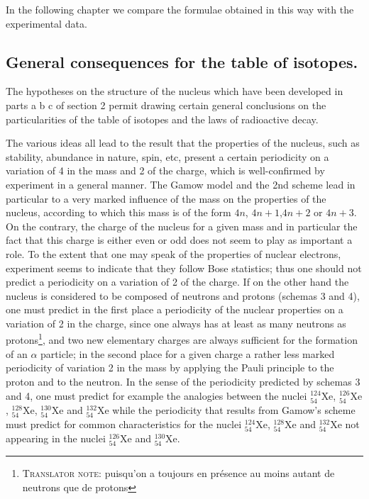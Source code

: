 \documentclass[a4paper,11pt]{article}
\newcommand{\?}[2]{#1\footnote{\textsc{Translator note}: #2}}
\newcommand{\El}[1]{\text{#1}}
\newcommand{\mnEl}[3]{{}^{#1}_{#2}{\El{#3}}}
\begin{document}
{{In the following chapter we compare the formulae obtained in this way with the experimental data.

\subsection{General consequences for the table of isotopes.}

The hypotheses on the structure of the nucleus which have been developed in parts a b c of section 2 permit drawing certain general conclusions on the particularities of the table of isotopes and the laws of radioactive decay.

The various ideas all lead to the result that the properties of the nucleus, such as stability, abundance in nature, spin, etc, present a certain periodicity on a variation of 4 in the mass and 2 of the charge, which is well-confirmed by experiment in a general manner. The Gamow model and the 2nd scheme lead in particular to a very marked influence of the mass on the properties of the nucleus, according to which this mass is of the form $4n$, $4n+1$,$4n+2$ or $4n+3$. On the contrary, the charge of the nucleus for a given mass and in particular the fact that this charge is either even or odd does not seem to play as important a role. To the extent that one may speak of the properties of nuclear electrons, experiment seems to indicate that they follow Bose statistics; thus one should not predict a periodicity on a variation of 2 of the charge. If on the other hand the nucleus is considered to be composed of neutrons and protons (schemas 3 and 4), one must predict in the first place a periodicity of the nuclear properties on a variation of 2 in the charge, \?{since one always has at least as many neutrons as protons}{puisqu’on a toujours en présence au moins autant de neutrons que de protons}, and two new elementary charges are always sufficient for the formation of an $\alpha$ particle; in the second place for a given charge a rather less marked periodicity of variation 2 in the mass by applying the Pauli principle to the proton and to the neutron. In the sense of the periodicity predicted by schemas 3 and 4, one must predict for example the analogies between the nuclei $\mnEl{124}{54}{Xe}$, $\mnEl{126}{54}{Xe}$, $\mnEl{128}{54}{Xe}$, $\mnEl{130}{54}{Xe}$ and $\mnEl{132}{54}{Xe}$ while the periodicity that results from Gamow's scheme must predict for common characteristics for the nuclei $\mnEl{124}{54}{Xe}$, $\mnEl{128}{54}{Xe}$ and $\mnEl{132}{54}{Xe}$ not appearing in the nuclei $\mnEl{126}{54}{Xe}$ and $\mnEl{130}{54}{Xe}$.
}}
\end{document}
